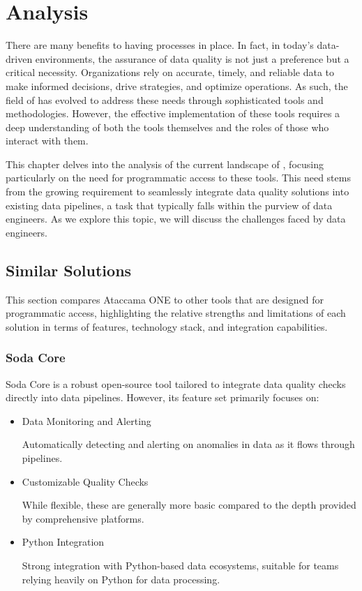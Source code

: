 \chapter{Analysis}
\label{chap:analysis}

There are many benefits to having  processes in place. In fact, in today's data-driven environments, the assurance of data quality is not just a preference but a critical necessity. Organizations rely on accurate, timely, and reliable data to make informed decisions, drive strategies, and optimize operations. As such, the field of  has evolved to address these needs through sophisticated tools and methodologies. However, the effective implementation of these tools requires a deep understanding of both the tools themselves and the roles of those who interact with them.

This chapter delves into the analysis of the current landscape of , focusing particularly on the need for programmatic access to these tools. This need stems from the growing requirement to seamlessly integrate data quality solutions into existing data pipelines, a task that typically falls within the purview of data engineers. As we explore this topic, we will discuss the challenges faced by data engineers. 

\section{Similar Solutions}

This section compares Ataccama ONE to other  tools that are designed for programmatic access, highlighting the relative strengths and limitations of each solution in terms of features, technology stack, and integration capabilities.

\subsection{Soda Core}

Soda Core \cite{sodacore} is a robust open-source tool tailored to integrate data quality checks directly into data pipelines. However, its feature set primarily focuses on:

\begin{itemize}
    \item Data Monitoring and Alerting
    
    Automatically detecting and alerting on anomalies in data as it flows through pipelines.

    \item Customizable Quality Checks

    While flexible, these are generally more basic compared to the depth provided by comprehensive  platforms.

    \item Python Integration
    
    Strong integration with Python-based data ecosystems, suitable for teams relying heavily on Python for data processing.
\end{itemize}

